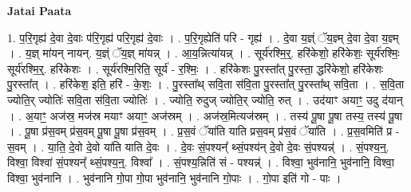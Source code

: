 \documentclass[17pt]{extarticle}
\begin{document}
\textbf{Jatai Paata} \newline

1. प॒रि॒गृह्य॑ दे॒वा दे॒वाः प॑रि॒गृह्य॑ परि॒गृह्य॑ दे॒वाः । . प॒रि॒गृह्येति॑ परि - गृह्य॑ । . दे॒वा य॒ज्ञ्ं ॅय॒ज्ञ्म् दे॒वा दे॒वा य॒ज्ञ्म् । . य॒ज्ञ् मा॑यन् नायन्. य॒ज्ञ्ं ॅय॒ज्ञ् मा॑यन्न् । . आ॒य॒न्नित्या॑यन्न् । . सूर्य॑रश्मि॒र्॒. हरि॑केशो॒ हरि॑केशः॒ सूर्य॑रश्मिः॒ सूर्य॑रश्मि॒र्॒. हरि॑केशः । . सूर्य॑रश्मि॒रिति॒ सूर्य॑ - र॒श्मिः॒ । . हरि॑केशः पु॒रस्ता᳚त् पु॒रस्ता॒ द्धरि॑केशो॒ हरि॑केशः पु॒रस्ता᳚त् । . हरि॑केश॒ इति॒ हरि॑ - के॒शः॒ । . पु॒रस्ता᳚थ् सवि॒ता स॑वि॒ता पु॒रस्ता᳚त् पु॒रस्ता᳚थ् सवि॒ता । . स॒वि॒ता ज्योति॒र् ज्योतिः॑ सवि॒ता स॑वि॒ता ज्योतिः॑ । . ज्योति॒ रुदुज् ज्योति॒र् ज्योति॒ रुत् । . उद॑याꣳ अयाꣳ॒॒ उदु द॑यान् । . अ॒याꣳ॒॒ अज॑स्र॒ मज॑स्र मयाꣳ अयाꣳ॒॒ अज॑स्रम् । . अज॑स्र॒मित्यज॑स्रम् । . तस्य॑ पू॒षा पू॒षा तस्य॒ तस्य॑ पू॒षा । . पू॒षा प्र॑स॒वम् प्र॑स॒वम् पू॒षा पू॒षा प्र॑स॒वम् । . प्र॒स॒वं ॅया॑ति याति प्रस॒वम् प्र॑स॒वं ॅया॑ति । . प्र॒स॒वमिति॑ प्र - स॒वम् । . या॒ति॒ दे॒वो दे॒वो या॑ति याति दे॒वः । . दे॒वः सं॒पश्यन्᳚ थ्सं॒पश्य॑न् दे॒वो दे॒वः सं॒पश्यन्न्॑ । . सं॒पश्य॒न्॒. विश्वा॒ विश्वा॑ सं॒पश्यन्᳚ थ्सं॒पश्य॒न्॒. विश्वा᳚ । . सं॒पश्य॒न्निति॑ सं - पश्यन्न्॑ । . विश्वा॒ भुव॑नानि॒ भुव॑नानि॒ विश्वा॒ विश्वा॒ भुव॑नानि । . भुव॑नानि गो॒पा गो॒पा भुव॑नानि॒ भुव॑नानि गो॒पाः । . गो॒पा इति॑ गो - पाः । \newline
\end{document}
